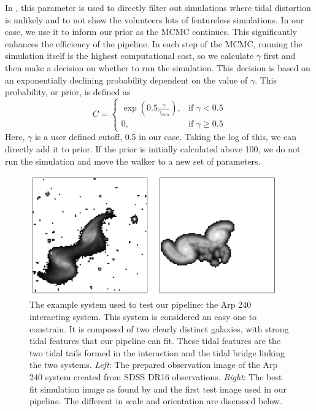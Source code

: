 In \citet{2016MNRAS.459..720H}, this parameter is used to directly filter out simulations where tidal distortion is unlikely and to not show the volunteers lots of featureless simulations. In our case, we use it to inform our prior as the MCMC continues. This significantly enhances the efficiency of the pipeline. In each step of the MCMC, running the simulation itself is the highest computational cost, so we calculate $\gamma$ first and then make a decision on whether to run the simulation. This decision is based on an exponentially declining probability dependent on the value of $\gamma$. This probability, or prior, is defined as 
\begin{equation}\label{tidal_prob}
    C = 
    \begin{cases}
        \exp(0.5\frac{\gamma}{\gamma_{min}}), & \text{if } \gamma < 0.5 \\
        0, & \text{if } \gamma \geq 0.5
    \end{cases}
\end{equation}
Here, $\gamma$ is a user defined cutoff, 0.5 in our case. Taking the log of this, we can directly add it to prior. If the prior is initially calculated above 100, we do not run the simulation and move the walker to a new set of parameters.

\begin{figure}
    \centering
    \includegraphics[width=0.95\textwidth]{Chapter1/figures/arp240-obs-sim.pdf}
    \caption{The example system used to test our pipeline: the Arp 240 interacting system. This system is considered an easy one to constrain. It is composed of two clearly distinct galaxies, with strong tidal features that our pipeline can fit. These tidal features are the two tidal tails formed in the interaction and the tidal bridge linking the two systems. \textit{Left}: The prepared observation image of the Arp 240 system created from SDSS DR16 observations. \textit{Right}: The best fit simulation image as found by \citet{2016MNRAS.459..720H} and the first test image used in our pipeline. The different in scale and orientation are discussed below.}
    \label{fig:arp240}
\end{figure}

